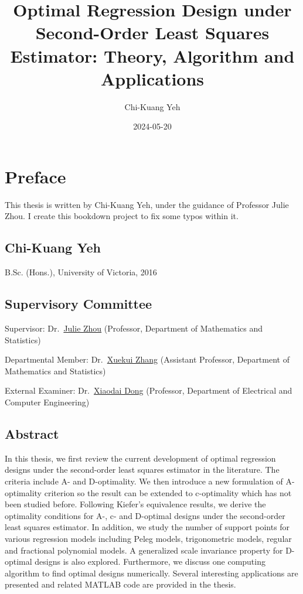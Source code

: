\documentclass[
]{book}
\title{Optimal Regression Design under Second-Order Least Squares Estimator: Theory, Algorithm and Applications}
\author{Chi-Kuang Yeh}
\date{2024-05-20}
\theoremstyle{definition}
\theoremstyle{definition}
\theoremstyle{definition}
\theoremstyle{definition}
\theoremstyle{remark}
\begin{document}
\maketitle

{
\setcounter{tocdepth}{1}
\tableofcontents
}
\newcommand{\btheta}{\mathbf{\theta}}

\chapter{Preface}\label{preface}

This thesis is written by Chi-Kuang Yeh, under the guidance of Professor Julie Zhou. I create this bookdown project to fix some typos within it.

\section{Chi-Kuang Yeh}\label{chi-kuang-yeh}

B.Sc. (Hons.), University of Victoria, 2016

\section{Supervisory Committee}\label{supervisory-committee}

Supervisor: Dr.~\href{https://www.uvic.ca/science/math-statistics/people/home/faculty/zhou_julie.php}{Julie Zhou} (Professor, Department of Mathematics and Statistics)

Departmental Member: Dr.~\href{https://www.uvic.ca/science/math-statistics/people/home/faculty/zhang_xuekui.php}{Xuekui Zhang} (Assistant Professor, Department of Mathematics and Statistics)

External Examiner: Dr.~\href{https://www.uvic.ca/ecs/ece/faculty-and-staff/home/faculty/dongxiaodai.php}{Xiaodai Dong} (Professor, Department of Electrical and Computer Engineering)

\section{Abstract}\label{abstract}

In this thesis, we first review the current development of optimal regression designs under the second-order least squares estimator in the literature. The criteria include A- and D-optimality. We then introduce a new formulation of A-optimality criterion so the result can be extended to c-optimality which has not been studied before. Following Kiefer's equivalence results, we derive the optimality conditions for A-, c- and D-optimal designs under the second-order least squares estimator. In addition, we study the number of support points for various regression models including Peleg models, trigonometric models, regular and fractional polynomial models. A generalized scale invariance property for D-optimal designs is also explored. Furthermore, we discuss one computing algorithm to find optimal designs numerically. Several interesting applications are presented and related MATLAB code are provided in the thesis.
\end{document}
